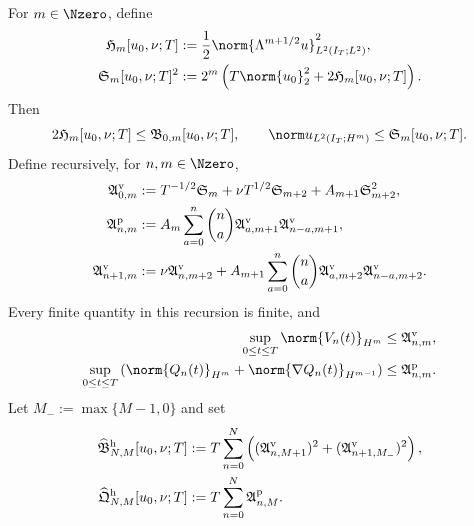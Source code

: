 \begin{proposition}
\label{prop:qc-critical-height-row-propagation}
For \(m\in\Nzero\), define
\begin{align}
 \mathfrak H_m[u_0,\nu;T]
 &:={}
 \frac12\norm{\Lambda^{m+1/2}u}_{L^2(I_T;L^2)}^2,
 \label{eq:qc-height-producer-coordinate}\\
 \mathfrak S_m[u_0,\nu;T]^2
 &:={}
 2^m\left(T\norm{u_0}_2^2+2\mathfrak H_m[u_0,\nu;T]\right).
 \label{eq:qc-spatial-row-from-height}
\end{align}
Then
\begin{equation}
 2\mathfrak H_m[u_0,\nu;T]
 \le\mathfrak B_{0,m}[u_0,\nu;T],
 \qquad
 \norm u_{L^2(I_T;H^m)}\le\mathfrak S_m[u_0,\nu;T].
 \label{eq:qc-height-spatial-bounds}
\end{equation}
Define recursively, for \(n,m\in\Nzero\),
\begin{align}
 \mathfrak A^{\rm v}_{0,m}
 &:={}
 T^{-1/2}\mathfrak S_m
 +\nu T^{1/2}\mathfrak S_{m+2}
 +A_{m+1}\mathfrak S_{m+2}^2,
 \label{eq:qc-height-base-pointwise-majorant}\\
 \mathfrak A^{\rm p}_{n,m}
 &:={}
 A_m\sum_{a=0}^{n}\binom na
 \mathfrak A^{\rm v}_{a,m+1}
 \mathfrak A^{\rm v}_{n-a,m+1},
 \label{eq:qc-height-pressure-majorant}\\
 \mathfrak A^{\rm v}_{n+1,m}
 &:={}
 \nu\mathfrak A^{\rm v}_{n,m+2}
 +A_{m+1}\sum_{a=0}^{n}\binom na
 \mathfrak A^{\rm v}_{a,m+2}
 \mathfrak A^{\rm v}_{n-a,m+2}.
 \label{eq:qc-height-temporal-majorant}
\end{align}
Every finite quantity in this recursion is finite, and
\begin{align}
 \sup_{0\le t\le T}\norm{V_n(t)}_{H^m}
 &\le\mathfrak A^{\rm v}_{n,m},
 \label{eq:qc-height-temporal-row-bound}\\
 \sup_{0\le t\le T}
 \left(\norm{Q_n(t)}_{H^m}
 +\norm{\nabla Q_n(t)}_{H^{m-1}}\right)
 &\le\mathfrak A^{\rm p}_{n,m}.
 \label{eq:qc-height-pressure-row-bound}
\end{align}
Let \(M_-:=\max\{M-1,0\}\) and set
\begin{align}
 \widehat{\mathfrak B}_{N,M}^{\rm h}[u_0,\nu;T]
 &:={}
 T\sum_{n=0}^{N}\left(
 (\mathfrak A^{\rm v}_{n,M+1})^2
 +(\mathfrak A^{\rm v}_{n+1,M_-})^2
 \right),
 \label{eq:qc-height-reconstructed-rectangle}\\
 \widehat{\mathfrak Q}_{N,M}^{\rm h}[u_0,\nu;T]
 &:={}
 T\sum_{n=0}^{N}\mathfrak A^{\rm p}_{n,M}.
 \label{eq:qc-height-reconstructed-pressure}
\end{align}

\end{proposition}
